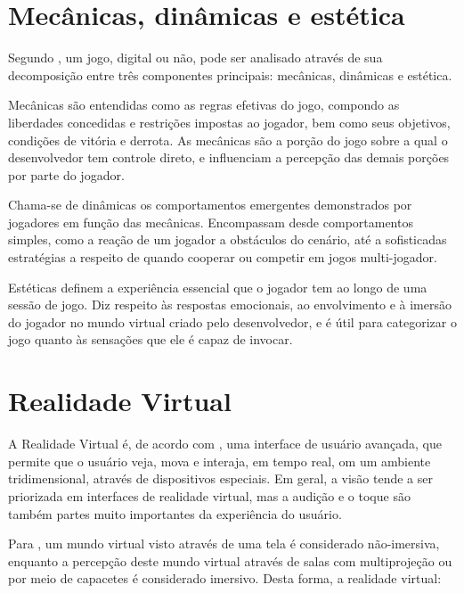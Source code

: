 \section{Mecânicas, dinâmicas e estética}\label{sec-mecanica-dinamica-estetica}

Segundo \cite{hunicke:2004}, um jogo, digital ou não, pode ser analisado através de
sua decomposição entre três componentes principais: mecânicas, dinâmicas e estética.

Mecânicas são entendidas como as regras efetivas do jogo, compondo as liberdades
concedidas e restrições impostas ao jogador, bem como seus objetivos, condições de
vitória e derrota. As mecânicas são a porção do jogo sobre a qual o desenvolvedor tem
controle direto, e influenciam a percepção das demais porções por parte do jogador.

Chama-se de dinâmicas os comportamentos emergentes demonstrados por jogadores em 
função das mecânicas. Encompassam desde comportamentos simples, como a reação de um
jogador a obstáculos do cenário, até a sofisticadas estratégias a respeito de quando
cooperar ou competir em jogos multi-jogador.

Estéticas definem a experiência essencial que o jogador tem ao longo de uma sessão de
jogo. Diz respeito às respostas emocionais, ao envolvimento e à imersão do jogador no
mundo virtual criado pelo desenvolvedor, e é útil para categorizar o jogo quanto às
sensações que ele é capaz de invocar.


\section{Realidade Virtual}\label{sec-realidadevirtual}

A Realidade Virtual é, de acordo com \cite{kirner:2007:RV_e_RA}, uma interface de
usuário avançada, que permite que o usuário veja, mova e interaja, em tempo real, 
om um ambiente tridimensional, através de dispositivos especiais. Em geral, a visão
tende a ser priorizada em interfaces de realidade virtual, mas a audição e o toque 
são também partes muito importantes da experiência do usuário.

Para \cite{kirner:2011:evolucao_RV}, um mundo virtual visto através de uma tela é
considerado não-imersiva, enquanto a percepção deste mundo virtual através de salas 
com multiprojeção ou por meio de capacetes é considerado imersivo. Desta forma, a
realidade virtual:

